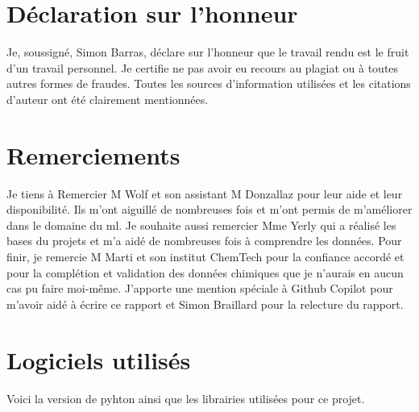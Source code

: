 \chapter{Déclaration sur l'honneur}
\label{chap:honneur}
Je, soussigné, Simon Barras, déclare sur l'honneur que le travail rendu est le fruit d'un travail
personnel. Je certifie ne pas avoir eu recours au plagiat ou à toutes autres formes de fraudes.
Toutes les sources d'information utilisées et les citations d'auteur ont été clairement mentionnées.

\chapter{Remerciements}
\label{chap:remerciement}
Je tiens à Remercier M Wolf et son assistant M Donzallaz pour leur aide et leur disponibilité.
Ils m'ont aiguillé de nombreuses fois et m'ont permis de m'améliorer dans le domaine du \acrlong{ml}.
Je souhaite aussi remercier Mme Yerly qui a réalisé les bases du projets et m'a aidé de nombreuses fois à comprendre les données.
Pour finir, je remercie M Marti et son institut ChemTech pour la confiance accordé et pour la complétion et validation des données chimiques que je n'aurais en aucun cas pu faire moi-même.
J'apporte une mention spéciale à Github Copilot pour m'avoir aidé à écrire ce rapport et Simon Braillard pour la relecture du rapport.

\chapter{Logiciels utilisés}
\label{chap:logiciel}
Voici la version de pyhton ainsi que les librairies utilisées pour ce projet.

